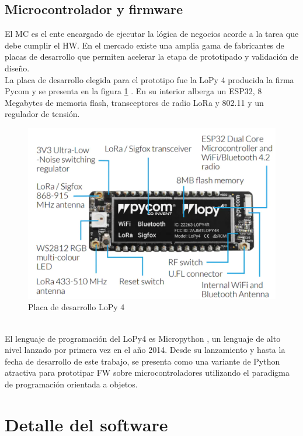 \subsection{Microcontrolador y firmware}
El MC es el ente encargado de ejecutar la lógica de negocios acorde a la tarea que debe cumplir el HW. En el mercado existe una amplia gama de fabricantes de placas de desarrollo que permiten acelerar la etapa de prototipado y validación de diseño.\\
La placa de desarrollo elegida para el prototipo fue la LoPy 4 producida la firma Pycom y se presenta en la figura \ref{fig:lopy4} . En su interior alberga un ESP32, 8 Megabytes de memoria flash, transceptores de radio LoRa y 802.11 y un regulador de tensión.\\
\begin{figure}[h]
	\centering
	\includegraphics[width=0.7\linewidth]{Figures/lopy4}
	\caption{Placa de desarrollo LoPy 4 \citep{lopy4}}
	\label{fig:lopy4}
\end{figure}\\
El lenguaje de programación del LoPy4 es Micropython \citep{micropy}, un lenguaje de alto nivel lanzado por primera vez en el año 2014. Desde su lanzamiento y hasta la fecha de desarrollo de este trabajo, se presenta como una variante de Python atractiva para prototipar FW sobre microcontroladores utilizando el paradigma de programación orientada a objetos.\\


\section{Detalle del software}
